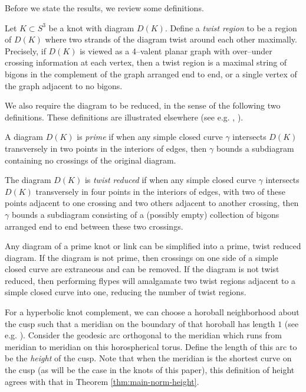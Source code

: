 Before we state the results, we review some definitions.

\begin{define}
  Let $K \subset S^3$ be a knot with diagram $D(K)$.  Define a
  \emph{twist region} to be a region of $D(K)$ where two strands of
  the diagram twist around each other maximally.  Precisely, if $D(K)$
  is viewed as a 4--valent planar graph with over--under crossing
  information at each vertex, then a twist region is a maximal string
  of bigons in the complement of the graph arranged end to end, or a
  single vertex of the graph adjacent to no bigons.  
\end{define}

We also require the diagram to be reduced, in the sense of the
following two definitions.  These definitions are illustrated
elsewhere (see e.g. \cite{lackenby:surg}, \cite{futer-purcell}).

\begin{define}
  A diagram $D(K)$ is \emph{prime} if when any simple closed curve
  $\gamma$ intersects $D(K)$ transversely in two points in the
  interiors of edges, then $\gamma$ bounds a subdiagram containing no
  crossings of the original diagram.
	\label{def:prime}
\end{define}

\begin{define}
  The diagram $D(K)$ is \emph{twist reduced} if when any simple closed
  curve $\gamma$ intersects $D(K)$ transversely in four points in the
  interiors of edges, with two of these points adjacent to one
  crossing and two others adjacent to another crossing, then $\gamma$
  bounds a subdiagram consisting of a (possibly empty) collection of
  bigons arranged end to end between these two crossings.
	\label{def:twred}
\end{define}

Any diagram of a prime knot or link can be simplified into a prime,
twist reduced diagram.  If the diagram is not prime, then crossings on
one side of a simple closed curve are extraneous and can be removed.
If the diagram is not twist reduced, then performing flypes will
amalgamate two twist regions adjacent to a simple closed curve into
one, reducing the number of twist regions.

For a hyperbolic knot complement, we can choose a horoball
neighborhood about the cusp such that a meridian on the boundary of
that horoball has length $1$ (see e.g. \cite{adams:waist}).  Consider
the geodesic arc orthogonal to the meridian which runs from meridian
to meridian on this horospherical torus.  Define the length of this
arc to be the \emph{height} of the cusp.  Note that when the meridian
is the shortest curve on the cusp (as will be the case in the knots of
this paper), this definition of height agrees with that in Theorem
\ref{thm:main-norm-height}.

